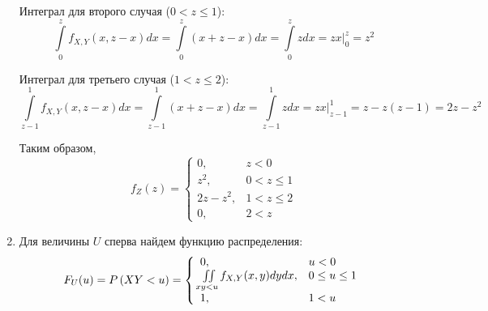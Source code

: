 \documentclass[a4paper,12pt]{article}
\begin{document}
\begin{enumerate}
        Интеграл для второго случая ($0 < z \le 1$):
        \begin{equation}
            \int \limits_0^z f_{X,Y}(x,z-x) dx
            = \int \limits_0^z \left ( x + z - x \right ) dx
            = \int \limits_0^z z dx
            = \left . z x \right |_0^z
            = z^2
        \end{equation}

        Интеграл для третьего случая ($1 < z \le 2$):
        \begin{equation}
            \int \limits_{z-1}^1 f_{X,Y}(x,z-x) dx
            = \int \limits_{z-1}^1 \left ( x + z - x \right ) dx
            = \int \limits_{z-1}^1 z dx
            = \left . z x \right |_{z-1}^1
            = z - z (z - 1)
            = 2 z - z^2
        \end{equation}

        Таким образом,
        \begin{equation}
            f_Z(z)
            = \left \{
            \begin{array}{ll}
                0,        & z < 0       \\
                z^2,      & 0 < z \le 1 \\
                2z - z^2, & 1 < z \le 2 \\
                0,        & 2 < z
            \end{array}
            \right .
        \end{equation}

        \item Для величины $U$ сперва найдем функцию распределения:
        \begin{equation}
            F_U(u)
            = P \left ( XY < u \right )
            = \left \{
            \begin{array}{ll}
                0,                                          & u < 0         \\
                \iint \limits_{xy < u} f_{X,Y}(x, y) dy dx, & 0 \le u \le 1 \\
                1,                                          & 1 < u
            \end{array}
            \right .
        \end{equation}


\end{enumerate}
\end{document}
